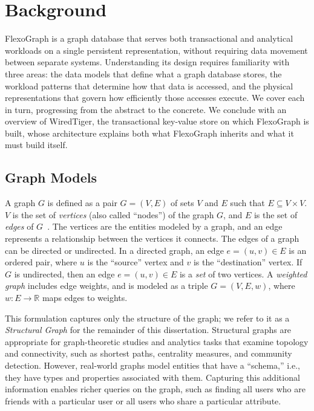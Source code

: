 \chapter{Background}
\label{sec:bg}
FlexoGraph is a graph database that serves both transactional and analytical workloads on a single persistent representation, without requiring data movement between separate systems.
Understanding its design requires familiarity with three areas: the data models that define what a graph database stores, the workload patterns that determine how that data is accessed, and the physical representations that govern how efficiently those accesses execute.
We cover each in turn, progressing from the abstract to the concrete.
We conclude with an overview of WiredTiger, the transactional key-value store on which FlexoGraph is built, whose architecture explains both what FlexoGraph inherits and what it must build itself.

\section{Graph Models}
\label{sec:bg:model}

A graph $G$ is defined as a pair $G = (V, E)$ of sets $V$ and $E$ such that $E \subseteq V \times V$. $V$ is the set of \textit{vertices} (also called ``nodes'') of the graph $G$, and $E$ is the set of \textit{edges} of $G$~\cite{diestel2017basics}.
The vertices are the entities modeled by a graph, and an edge represents a relationship between the vertices it connects.
The edges of a graph can be directed or undirected.
In a directed graph, an edge $e = (u, v) \in E$ is an ordered pair, where $u$ is the ``source'' vertex and $v$ is the ``destination'' vertex.
If $G$ is undirected, then an edge $e = (u, v) \in E$ is a \emph{set} of two vertices.
A \emph{weighted graph} includes edge weights, and is modeled as a triple $G = (V, E, w)$, where $w: E \rightarrow \mathbb{R}$ maps edges to weights.

This formulation captures only the structure of the graph; we refer to it as a \emph{Structural Graph} for the remainder of this dissertation.
Structural graphs are appropriate for graph-theoretic studies and analytics tasks that examine topology and connectivity, such as shortest paths, centrality measures, and community detection.
However, real-world graphs model entities that have a ``schema,'' i.e., they have types and properties associated with them.
Capturing this additional information enables richer queries on the graph, such as finding all users who are friends with a particular user or all users who share a particular attribute.

